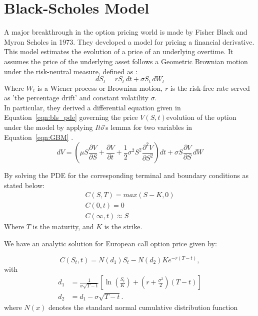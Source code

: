 \section{Black-Scholes Model}
A major breakthrough in the option pricing world is made by Fisher Black and Myron Scholes \parencite{bs1973} in 1973. They developed a model for pricing a financial derivative. This model 
estimates the evolution of a price of an underlying overtime. It assumes the price of the underlying asset follows a Geometric Brownian motion under the risk-neutral measure, defined as :
\begin{equation}
\label{eqn:GBM}
dS_{t}=r S_{t}\,dt+\sigma S_{t}\,dW_{t}
\end{equation}
Where
$W_{t}$ is a Wiener process or Brownian motion,  $r$ is the risk-free rate served as 'the percentage drift' and constant volatility $\sigma$.\\

In particular, they derived a differential equation given in Equation~\ref{eqn:bls_pde} governing the price $ V(S, t)$evolution of the option under the model by applying \textit{It\^{o}}'s lemma for two variables in Equation~\ref{eqn:GBM} . 
 \begin{equation}
 \label{eqn:bls_pde}
dV=\left(\mu S{\frac {\partial V}{\partial S}}+{\frac {\partial V}{\partial t}}+{\frac {1}{2}}\sigma ^{2}S^{2}{\frac {\partial ^{2}V}{\partial S^{2}}}\right)dt+\sigma S{\frac {\partial V}{\partial S}}\,dW
\end{equation}

By solving the PDE for the corresponding terminal and boundary conditions as stated below:
\begin{align}
C(S, T) = max(S-K, 0)\\
C(0, t) = 0\\
C(\infty,t) \approx S
\end{align}
 Where $T$ is the maturity, and $K$ is the strike.
 
We have an analytic solution for European call option price given by:

 \begin{equation}
 \label{eqn:bls}
C(S_{t},t) =N(d_{1})S_{t}-N(d_{2})Ke^{-r(T-t)},
\end{equation}
with
\begin{align}
d_{1}&={\frac {1}{\sigma {\sqrt {T-t}}}}\left[\ln \left({\frac {S_{t}}{K}}\right)+\left(r+{\frac {\sigma ^{2}}{2}}\right)(T-t)\right]\\
d_{2}&=d_{1}-\sigma {\sqrt {T-t}}.
 \end{align}
where $N(x)$ denotes the standard normal cumulative distribution function

